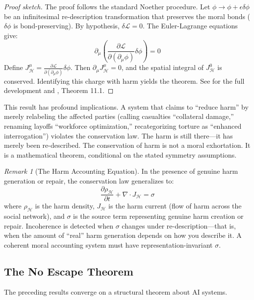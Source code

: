 \documentclass[12pt,letterpaper]{article}
\theoremstyle{definition}
\theoremstyle{remark}
\newtheorem{remark}[theorem]{Remark}
\newcommand{\harm}{\mathcal{H}}
\newcommand{\Lag}{\mathcal{L}}
\begin{document}
\begin{proof}[Proof sketch]
The proof follows the standard Noether procedure. Let $\phi \to \phi + \epsilon \delta\phi$ be an infinitesimal re-description transformation that preserves the moral bonds ($\delta\phi$ is bond-preserving). By hypothesis, $\delta\Lag = 0$. The Euler-Lagrange equations give:
\[
\partial_\mu \left( \frac{\partial \Lag}{\partial(\partial_\mu \phi)} \delta\phi \right) = 0
\]
Define $J^\mu_\harm = \frac{\partial \Lag}{\partial(\partial_\mu \phi)} \delta\phi$. Then $\partial_\mu J^\mu_\harm = 0$, and the spatial integral of $J^0_\harm$ is conserved. Identifying this charge with harm yields the theorem. See \cite{bond2026noether} for the full development and \cite{bond2026geometric}, Theorem 11.1.
\end{proof}

This result has profound implications. A system that claims to ``reduce harm'' by merely relabeling the affected parties (calling casualties ``collateral damage,'' renaming layoffs ``workforce optimization,'' recategorizing torture as ``enhanced interrogation'') violates the conservation law. The harm is still there---it has merely been re-described. The conservation of harm is not a moral exhortation. It is a mathematical theorem, conditional on the stated symmetry assumptions.

\begin{remark}[The Harm Accounting Equation]
In the presence of genuine harm generation or repair, the conservation law generalizes to:
\begin{equation}
\frac{\partial \rho_\harm}{\partial t} + \nabla \cdot J_\harm = \sigma
\label{eq:accounting}
\end{equation}
where $\rho_\harm$ is the harm density, $J_\harm$ is the harm current (flow of harm across the social network), and $\sigma$ is the source term representing genuine harm creation or repair. Incoherence is detected when $\sigma$ changes under re-description---that is, when the amount of ``real'' harm generation depends on how you describe it. A coherent moral accounting system must have representation-invariant $\sigma$.
\end{remark}

\subsection{The No Escape Theorem}

The preceding results converge on a structural theorem about AI systems.
\end{document}
